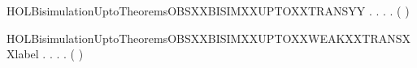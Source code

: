 \newcommand{\HOLBisimulationUptoTheoremsOBSXXBISIMXXUPTOXXTRANS}{\UseVerbatim{HOLBisimulationUptoTheoremsOBSXXBISIMXXUPTOXXTRANS}}
\begin{SaveVerbatim}{HOLBisimulationUptoTheoremsOBSXXBISIMXXUPTOXXTRANSYY}
\HOLTokenTurnstile{} \HOLSymConst{\HOLTokenForall{}}.
         \HOLSymConst{\HOLTokenImp{}}
       \HOLSymConst{\HOLTokenForall{}} .
              \HOLSymConst{\HOLTokenImp{}}
           \HOLSymConst{\HOLTokenForall{}} .
                \HOLTokenTransBegin{}\HOLTokenTransEnd {} \HOLSymConst{\HOLTokenImp{}}
               \HOLSymConst{\HOLTokenExists{}}.
                    \HOLTokenWeakTransBegin{}\HOLTokenWeakTransEnd {} \HOLSymConst{\HOLTokenConj{}}
                   (    )  
\end{SaveVerbatim}
\newcommand{\HOLBisimulationUptoTheoremsOBSXXBISIMXXUPTOXXTRANSYY}{\UseVerbatim{HOLBisimulationUptoTheoremsOBSXXBISIMXXUPTOXXTRANSYY}}
\begin{SaveVerbatim}{HOLBisimulationUptoTheoremsOBSXXBISIMXXUPTOXXWEAKXXTRANSXXlabel}
\HOLTokenTurnstile{} \HOLSymConst{\HOLTokenForall{}}.
         \HOLSymConst{\HOLTokenImp{}}
       \HOLSymConst{\HOLTokenForall{}} .
              \HOLSymConst{\HOLTokenImp{}}
           \HOLSymConst{\HOLTokenForall{}} .
                \HOLTokenWeakTransBegin{} \HOLTokenWeakTransEnd {} \HOLSymConst{\HOLTokenImp{}}
               \HOLSymConst{\HOLTokenExists{}}.
                    \HOLTokenWeakTransBegin{} \HOLTokenWeakTransEnd {} \HOLSymConst{\HOLTokenConj{}}
                   (    )  
\end{SaveVerbatim}
